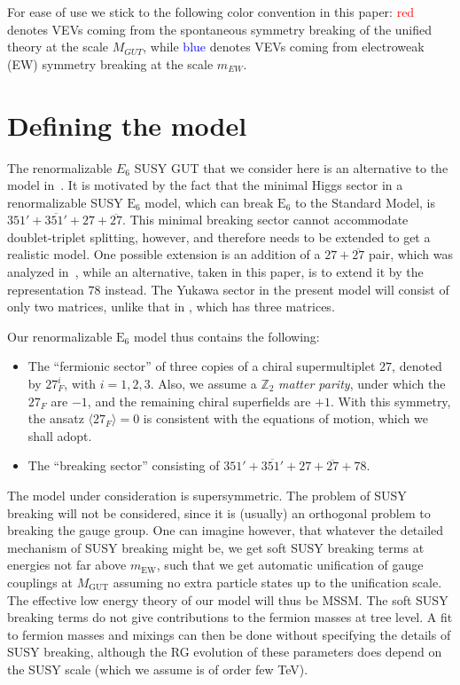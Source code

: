 \documentclass[a4paper,12pt]{article}
\def\RED{\textcolor{red}}
\def\BLUE{\textcolor{blue}}
\def\EE{\mathrm{E}_6}
\begin{document}
For ease of use we stick to the following color convention in this paper: \RED{red} denotes VEVs coming from the spontaneous symmetry breaking of the unified theory at the scale $M_{GUT}$, while \BLUE{blue} denotes VEVs coming from electroweak (EW) symmetry breaking at the scale $m_{EW}$.


\section{Defining the model\label{section:define-model}}

The renormalizable $E_6$ SUSY GUT  that we consider here is an alternative to the model in~\cite{Bajc:2013qra}. It is motivated by the fact that the minimal Higgs sector in a renormalizable SUSY $\EE$ model, which can break $\EE$ to the Standard Model, is $351'+\overline{351'}+27+\overline{27}$. This minimal breaking sector cannot accommodate doublet-triplet splitting, however, and therefore needs to be extended to get a realistic model. One possible extension is an addition of a $27+\overline{27}$ pair, which was analyzed in~\cite{Bajc:2013qra}, while an alternative, taken in this paper, is to extend it by the representation $78$ instead. The Yukawa sector in the present model will consist of only
two matrices, unlike that in \cite{Bajc:2013qra}, which has three matrices.

Our renormalizable $\EE$ model thus contains the following:
\begin{itemize}
\item The ``fermionic sector'' of three copies of a chiral supermultiplet $27$, denoted by $27_F^i$, with $i=1,2,3$. Also, we assume a $\mathbb{Z}_2$ \textit{matter parity}, under which the $27_F$ are $-1$, and the remaining chiral superfields are $+1$. With this symmetry, the ansatz $\langle 27_F\rangle=0$ is consistent with the equations of motion, which we shall adopt.
\item The ``breaking sector'' consisting of $351'+\overline{351'}+27+\overline{27}+78$.
\end{itemize}

The model under consideration is supersymmetric. The problem of SUSY breaking will not be considered, since it is (usually) an orthogonal problem to breaking the gauge group. One can imagine however, that whatever the detailed mechanism of SUSY breaking might be, we get soft SUSY breaking terms at energies not far above $m_{\textrm{EW}}$, such that we get automatic unification of gauge couplings at $M_{\textrm{GUT}}$ assuming no extra particle states up to the unification scale. The effective low energy theory of our model will thus be MSSM. The soft SUSY breaking terms do not give contributions to the fermion masses at tree level.  A fit to fermion masses and mixings can then be done without specifying the details of
SUSY breaking, although the RG evolution of these parameters does depend on the SUSY scale (which we assume is of order few TeV).
\end{document}

